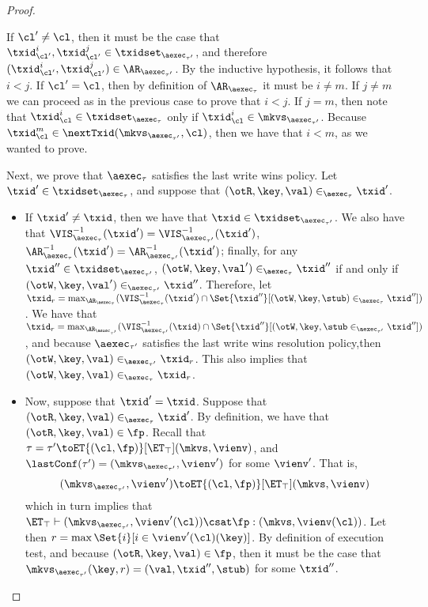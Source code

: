 \begin{proof}
\begin{itemize}
\begin{itemize}
If $\cl' \neq \cl$, then it must be the case that $\txid_{\cl'}^{i}, \txid_{\cl'}^{j} \in \txidset_{\aexec_{\tau'}}$, 
and therefore $(\txid_{\cl'}^{i}, \txid_{\cl'}^{j}) \in \AR_{\aexec_{\tau'}}$. By the inductive hypothesis, 
it follows that $i < j$. If $\cl' = \cl$, then by definition of $\AR_{\aexec_{\tau}}$ it must be  $i \neq m$. 
If $j \neq m$ we can proceed as in the previous case to prove that $i < j$. If $j = m$, then 
note that $\txid_{\cl}^{i} \in \txidset_{\aexec_{\tau}}$ only if $\txid_{\cl}^{i} \in \mkvs_{\aexec_{\tau'}}$. 
Because $\txid_{\cl}^{m} \in \nextTxid(\mkvs_{\aexec_{\tau'}}, \cl)$, then we have that $i < m$, 
as we wanted to prove.
\end{itemize}

Next, we prove that $\aexec_{\tau}$ satisfies the last write wins policy. 
Let $\txid' \in \txidset_{\aexec_{\tau}}$, and suppose that $(\otR, \key, \val) \in_{\aexec_{\tau}} \txid'$. 
\begin{itemize} 
\item If $\txid' \neq \txid$, then we have that $\txid \in \txidset_{\aexec_{\tau'}}$. We also have that 
$\VIS^{-1}_{\aexec_{\tau}}(\txid') = \VIS^{-1}_{\aexec_{\tau'}}(\txid')$, $\AR^{-1}_{\aexec_{\tau}}(\txid') 
= \AR^{-1}_{\aexec_{\tau'}}(\txid')$; finally, for any $\txid'' \in \txidset_{\aexec_{\tau'}}$, 
$(\otW, \key, \val') \in_{\aexec_{\tau}} \txid''$ if and only if $(\otW, \key, \val') \in_{\aexec_{\tau'}} 
\txid''$. Therefore, let $\txid_{r} = \max_{\AR_{\aexec_{\tau}}}(\VIS^{-1}_{\aexec_{\tau}}(\txid') \cap 
\Set{\txid'' }[ (\otW, \key, \stub) \in_{\aexec_{\tau}} \txid''])$. We have that $\txid_{r} = \max_{\AR_{\aexec_{\tau'}}}(\VIS^{-1}_{\aexec_{\tau'}}(\txid) 
\cap \Set{ \txid'' }[ (\otW, \key, \stub \in_{\aexec_{\tau'}} \txid''])$, and because $\aexec_{\tau'}$ satisfies the last write 
wins resolution policy,then $(\otW, \key, \val) \in_{\aexec_{\tau'}} \txid_{r}$. This also implies that 
$(\otW, \key, \val) \in_{\aexec_{\tau}} \txid_{r}$. 

\item Now, suppose that $\txid' = \txid$. Suppose that $(\otR, \key, \val) \in_{\aexec_{\tau}} \txid'$. 
By definition, we have that $(\otR, \key, \val) \in \fp$. Recall that $\tau = \tau' \toET{(\cl, \fp)}[\ET_{\top}] (\mkvs, \vienv)$, 
and $\lastConf(\tau') = (\mkvs_{\aexec_{\tau'}}, \vienv')$ for some $\vienv'$. 
That is, 
\[
    (\mkvs_{\aexec_{\tau'}}, \vienv') \toET{(\cl, \fp)}[\ET_{\top}] (\mkvs, \vienv)
\]
which in turn implies that $\ET_{\top} \vdash (\mkvs_{\aexec_{\tau'}}, \vienv'(\cl)) \csat \fp : (\mkvs,\vienv(\cl) )$. 
Let then $r = \max\Set{i}[ i \in \vienv'(\cl)(\key)]$. 
By definition of execution test, and because $(\otR, \key, \val) \in \fp$, then it must be the case that 
$\mkvs_{\aexec_{\tau'}}(\key, r) = (\val, \txid'', \stub)$ for some $\txid''$. 


\end{itemize}
\end{itemize}
\end{proof}
